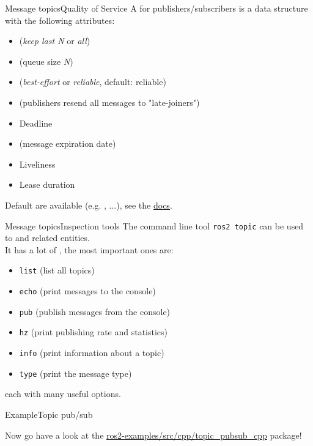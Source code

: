 \begin{frame}{Message topics}{Quality of Service}
	A  for publishers/subscribers is a data structure with the following attributes:
	\begin{itemize}
		\item {} (\emph{keep last N} or \emph{all})
		\item {} (queue size \emph{N})
		\item {} (\emph{best-effort} or \emph{reliable}, default: reliable)
		\item {} (publishers resend all messages to "late-joiners")
		\item Deadline
		\item {} (message expiration date)
		\item Liveliness
		\item Lease duration
	\end{itemize}
	Default  are available (e.g. , ...), see the \href{https://docs.ros.org/en/humble/Concepts/About-Quality-of-Service-Settings.html}{\color{blue}\underline{docs}}.
\end{frame}
\begin{frame}{Message topics}{Inspection tools}
  The command line tool \texttt{ros2 topic} can be used to  and related entities.\\
  It has a lot of , the most important ones are:
  \begin{itemize}
    \item \texttt{list} (list all topics)
    \item \texttt{echo} (print messages to the console)
    \item \texttt{pub} (publish messages from the console)
    \item \texttt{hz} (print publishing rate and statistics)
    \item \texttt{info} (print information about a topic)
    \item \texttt{type} (print the message type)
  \end{itemize}
  each with many useful options.
\end{frame}

\begin{frame}{Example}{Topic pub/sub}
  \begin{block}{}
    \centering
	  Now go have a look at the \href{https://github.com/IntelligentSystemsLabUTV/ros2-examples/tree/humble/src/cpp/topic_pubsub_cpp}{\color{blue}\underline{ros2-examples/src/cpp/topic\_pubsub\_cpp}} package!
  \end{block}
\end{frame}

